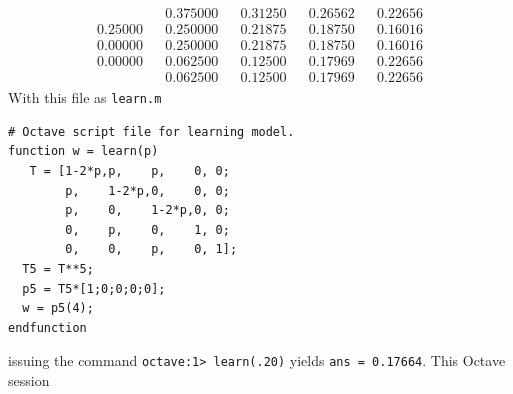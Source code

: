 \begin{exercises}
\begin{answer}
\begin{exparts}
\begin{equation*}
\begin{array}{cc|ccccc}
\begin{array}{c}
              0.25000 \\
              0.00000 \\
              0.00000
            \end{array}
            &\begin{array}{c}
              0.375000 \\
              0.250000 \\
              0.250000 \\
              0.062500 \\
              0.062500
            \end{array}
            &\begin{array}{c}
              0.31250 \\
              0.21875 \\
              0.21875 \\
              0.12500 \\
              0.12500
            \end{array}
            &\begin{array}{c}
              0.26562 \\
              0.18750 \\
              0.18750 \\
              0.17969 \\
              0.17969
            \end{array}
            &\begin{array}{c}
              0.22656 \\
              0.16016 \\
              0.16016 \\
              0.22656 \\
              0.22656
            \end{array}
          \end{array}
        \end{equation*}
       \partsitem With this file as \texttt{learn.m}
\begin{lstlisting}
# Octave script file for learning model.
function w = learn(p)
   T = [1-2*p,p,    p,    0, 0;
        p,    1-2*p,0,    0, 0;  
        p,    0,    1-2*p,0, 0;
        0,    p,    0,    1, 0;
        0,    0,    p,    0, 1]; 
  T5 = T**5;
  p5 = T5*[1;0;0;0;0];
  w = p5(4);
endfunction
\end{lstlisting}
        issuing the command \texttt{octave:1> learn(.20)} yields
        \texttt{ans = 0.17664}.
       \partsitem This Octave session

\end{exparts}
\end{answer}
\end{exercises}
